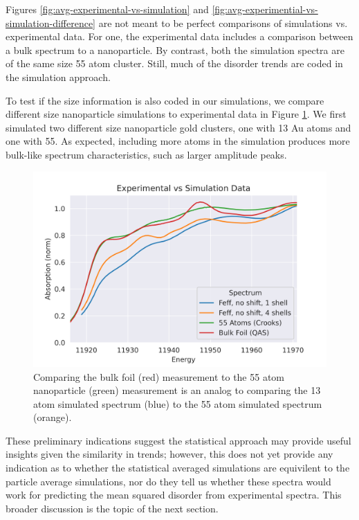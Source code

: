 Figures \ref{fig:avg-experimental-vs-simulation} and \ref{fig:avg-experimential-vs-simulation-difference} are not meant to be perfect comparisons of simulations vs. experimental data. For one, the experimental data includes a comparison between a bulk spectrum to a nanoparticle. By contrast, both the simulation spectra are of the same size 55 atom cluster. Still, much of the disorder trends are coded in the simulation approach. 

To test if the size information is also coded in our simulations, we compare different size nanoparticle simulations to experimental data in Figure \ref{fig:avg-experimental-vs-simulation2}. We first simulated two different size nanoparticle gold clusters, one with 13 Au atoms and one with 55. As expected, including more atoms in the simulation produces more bulk-like spectrum characteristics, such as larger amplitude peaks.

\begin{figure}[h]
	\centering
	\includegraphics[width=.7\linewidth]{Chapters/Figures/Bulk_55atom_experimental_theory_comparison.png}
	\caption[Simulation vs. Experimental 2]{Comparing the bulk foil (red) measurement to the 55 atom nanoparticle (green) measurement is an analog to comparing the 13 atom simulated spectrum (blue) to the 55 atom simulated spectrum (orange).}
	\label{fig:avg-experimental-vs-simulation2}
\end{figure}


These preliminary indications suggest the statistical approach may provide useful insights given the similarity in trends; however, this does not yet provide any indication as to whether the statistical averaged simulations are equivilent to the particle average simulations, nor do they tell us whether these spectra would work for predicting the mean squared disorder from experimental spectra. This broader discussion is the topic of the next section.


